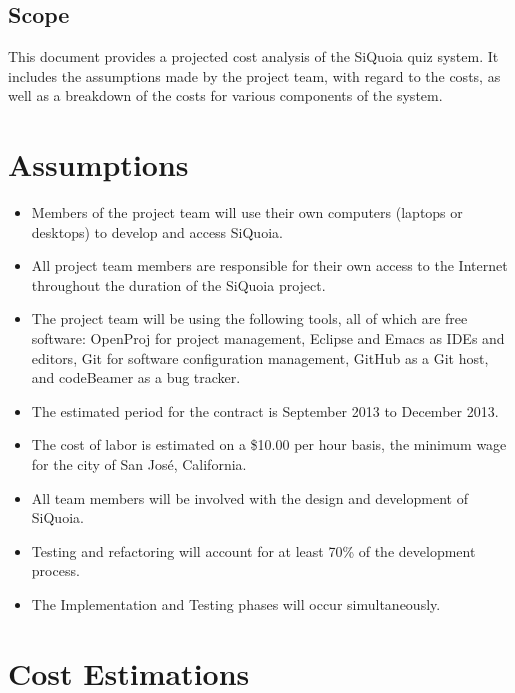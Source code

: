 \documentclass[12pt]{article}
\begin{document}
\subsection{Scope}
This document provides a projected cost analysis of the SiQuoia quiz
system. It includes the assumptions made by the project team, with
regard to the costs, as well as a breakdown of the costs for various
components of the system.

\section{Assumptions}
\begin{itemize}
\item Members of the project team will use their own computers
  (laptops or desktops) to develop and access SiQuoia.
\item All project team members are responsible for their own access to
  the Internet throughout the duration of the SiQuoia project.
\item The project team will be using the following tools, all of which
  are free software: OpenProj for project management, Eclipse and
  Emacs as IDEs and editors, Git for software configuration
  management, GitHub as a Git host, and codeBeamer as a bug tracker.
\item The estimated period for the contract is September 2013 to
  December 2013.
\item The cost of labor is estimated on a \$10.00 per hour basis, the
  minimum wage for the city of San Jos{\'e}, California.
\item All team members will be involved with the design and
  development of SiQuoia.
\item Testing and refactoring will account for at least 70\% of the
  development process.
\item The Implementation and Testing phases will occur simultaneously.
\end{itemize}

\section{Cost Estimations}
\end{document}
